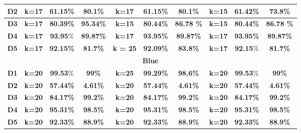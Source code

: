 \begin{table}
{\begin{tabular}{ |c|c|c|c|c|c|c|c|c|c| }
     					  \textbf{D2} & \textbf{k=17} & \textbf{61.15\%} & \textbf{80.1\%} & \textbf{k=17} & \textbf{61.15\%} & \textbf{80.1\%} & k=15 & \textbf{61.42\%} & \textbf{73.8}\% 
\\ \hline
     				 \textbf{D3} & \textbf{k=17} &  \textbf{80.39\%} & \textbf{95.34\%} & \textbf{k=15} & \textbf{80.44\%} & \textbf{86.78 \%} & \textbf{k=15} & \textbf{80.44\%} & \textbf{86.78 \%} 
\\ \hline                        
                        \textbf{D4} & \textbf{k=17} & \textbf{93.95}\% & \textbf{89.87\%} &
                         \textbf{k=17} & \textbf{93.95\%} & \textbf{89.87\%} &
                         \textbf{k=17} & \textbf{93.95\%} & \textbf{89.87\%}
\\ \hline                           
                         \textbf{D5} & \textbf{k=17} & \textbf{92.15\%} & \textbf{81.7\%} & \textbf{k = 25} & \textbf{92.09\%} & \textbf{83.8\%} &
                         \textbf{k=17} & \textbf{92.15}\% & \textbf{81.7\%} \\
  \hline
  \multicolumn{10}{|c|}{\textbf{Blue}}\\
  \hline
 					 \textbf{D1} & \textbf{k=20} & \textbf{99.53}\% & \textbf{99\%} & \textbf{k=25} & \textbf{99.29\%} & \textbf{98.6\%} & \textbf{k=20} & \textbf{99.53}\% & \textbf{99\%}
\\ \hline
     					  \textbf{D2} & \textbf{k=20} & \textbf{57.44\%} & \textbf{4.61\%} & \textbf{k=20} & \textbf{57.44\%} & \textbf{4.61\%} & \textbf{k=20} & \textbf{57.44\%} & \textbf{4.61\%} 
\\ \hline
     				 \textbf{D3}  & \textbf{ k=20} & \textbf{84.17\%} & \textbf{99.2\%} & \textbf{k=20} & \textbf{84.17\%} & \textbf{99.2\%} & \textbf{k=20} & \textbf{84.17\%} & \textbf{99.2\%} 
\\ \hline                        
                         \textbf{D4} & \textbf{ k=20} & \textbf{95.31\%} & \textbf{98.5\%} & \textbf{ k=20} & \textbf{95.31\%} & \textbf{98.5\%} & \textbf{ k=20} & \textbf{95.31\%} & \textbf{98.5\%}
\\ \hline                           
                         \textbf{D5} & \textbf{ k=20} & \textbf{92.33\%} & \textbf{88.9\%} & \textbf{ k=20} & \textbf{92.33\%} & \textbf{88.9\%} & \textbf{ k=20} & \textbf{92.33\%} & \textbf{88.9\%}\\

\end{tabular}}
\end{table}
